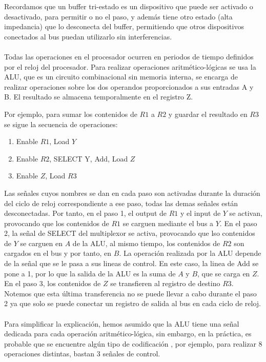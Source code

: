 Recordamos que un buffer tri-estado es un dispositivo que puede ser activado o desactivado, para permitir o no el paso, y además
tiene otro estado (alta impedancia) que lo desconecta del buffer, permitiendo que otros dispositivos conectados al bus puedan
utilizarlo sin interferencias.
\\ \\ Todas las operaciones en el procesador ocurren en periodos de tiempo definidos por el reloj del procesador. Para realizar operaciones 
aritmético-lógicas se usa la ALU, que es un circuito combinacional sin memoria interna, se encarga de realizar operaciones sobre los dos operandos proporcionados a 
sus entradas A y B. El resultado se almacena temporalmente en el registro Z.
\begin{ejemplo}
   Por ejemplo, para sumar los contenidos de $R1$ a $R2$ y guardar el resultado en $R3$ se sigue la secuencia de operaciones: 
   \begin{enumerate}
       \item Enable $R1$, Load $Y$
        \item Enable $R2$, SELECT Y, Add, Load $Z$
        \item Enable $Z$, Load $R3$
   \end{enumerate}
\end{ejemplo}
Las señales cuyos nombres se dan en cada paso son activadas durante la duración
del ciclo de reloj correspondiente a ese paso, todas las demas señales están desconectadas. Por tanto, en el paso
1, el output de $R1$ y el input de $Y$ se activan, provocando que los contenidos de $R1$ se carguen mediante el bus a $Y$.
En el paso 2, la señal de SELECT del multiplexor se activa, provocando que lso contenidos de $Y$ se carguen en $A$ de la ALU, al mismo tiempo,
los contenidos de $R2$ son cargados en el bus y por tanto, en $B$. La operación realizada por la ALU depende de la señal que se le pasa a sus lineas de control.
En este caso, la linea de Add se pone a 1, por lo que la salida de la ALU es la suma de $A$ y $B$, que se carga en $Z$. En el paso 3, los contenidos de $Z$ 
se transfieren al registro de destino $R3$. Notemos que esta última transferencia no se puede llevar a cabo durante el paso 2 ya que solo se puede conectar un registro de salida al bus
en cada ciclo de reloj.
\\ \\
Para simplificar la explicación, hemos asumido que la ALU tiene una señal dedicada para cada operación aritmético-lógica, sin embargo, en la práctica, es probable que se encuentre algún tipo de codificación
, por ejemplo, para realizar 8 operaciones distintas, bastan 3 señales de control.
